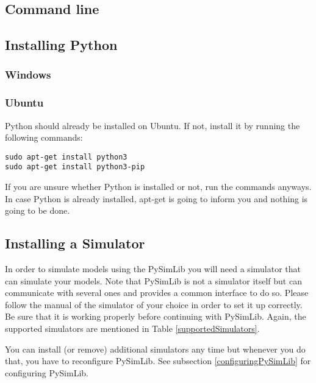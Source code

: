 \subsection{Command line}






\subsection{Installing Python}

\subsubsection{Windows}


\subsubsection{Ubuntu}
Python should already be installed on Ubuntu.
If not, install it by running the following commands:
\lstset{language=bash}
\begin{lstlisting}
sudo apt-get install python3
sudo apt-get install python3-pip
\end{lstlisting}
If you are unsure whether Python is installed or not, run the commands anyways.
In case Python is already installed, apt-get is going to inform you and nothing is going to be done.





\subsection{Installing a Simulator}

In order to simulate models using the PySimLib you will need a simulator that can simulate your models.
Note that PySimLib is not a simulator itself but can communicate with several ones and provides a common interface to do so.
Please follow the manual of the simulator of your choice in order to set it up correctly.
Be sure that it is working properly before continuing with PySimLib.
Again, the supported simulators are mentioned in Table \ref{supportedSimulators}.

You can install (or remove) additional simulators any time but whenever you do that, you have to reconfigure PySimLib.
See subsection \ref{configuringPySimLib} for configuring PySimLib.





